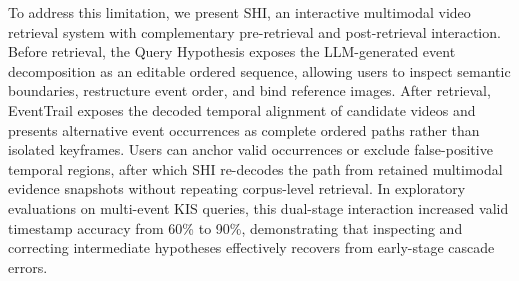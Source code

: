 To address this limitation, we present SHI, an interactive multimodal
video retrieval system with complementary pre-retrieval and post-retrieval
interaction. Before retrieval, the Query Hypothesis exposes the
LLM-generated event decomposition as an editable ordered sequence, allowing
users to inspect semantic boundaries, restructure event order, and bind
reference images. After retrieval, EventTrail exposes the decoded
temporal alignment of candidate videos and presents alternative event
occurrences as complete ordered paths rather than isolated keyframes. Users can
anchor valid occurrences or exclude false-positive temporal regions, after which
SHI re-decodes the path from retained multimodal evidence snapshots without
repeating corpus-level retrieval. In exploratory evaluations on multi-event KIS
queries, this dual-stage interaction increased valid timestamp accuracy from
60\% to 90\%, demonstrating that inspecting and correcting intermediate
hypotheses effectively recovers from early-stage cascade errors.